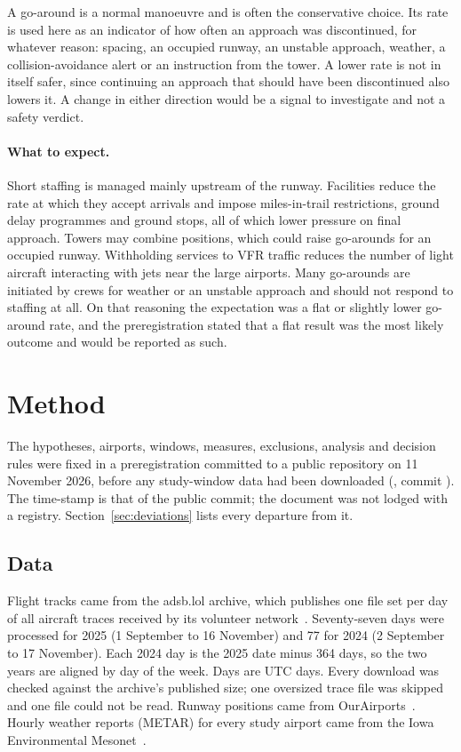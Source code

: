 \documentclass[11pt]{article}
\begin{document}
A go-around is a normal manoeuvre and is often the conservative choice. Its rate is used here as an indicator of how often an approach was discontinued, for whatever reason: spacing, an occupied runway, an unstable approach, weather, a collision-avoidance alert or an instruction from the tower. A lower rate is not in itself safer, since continuing an approach that should have been discontinued also lowers it. A change in either direction would be a signal to investigate and not a safety verdict.

\paragraph{What to expect.} Short staffing is managed mainly upstream of the runway. Facilities reduce the rate at which they accept arrivals and impose miles-in-trail restrictions, ground delay programmes and ground stops, all of which lower pressure on final approach. Towers may combine positions, which could raise go-arounds for an occupied runway. Withholding services to VFR traffic reduces the number of light aircraft interacting with jets near the large airports. Many go-arounds are initiated by crews for weather or an unstable approach and should not respond to staffing at all. On that reasoning the expectation was a flat or slightly lower go-around rate, and the preregistration stated that a flat result was the most likely outcome and would be reported as such.

\section{Method}\label{sec:method}

The hypotheses, airports, windows, measures, exclusions, analysis and decision rules were fixed in a preregistration committed to a public repository on 11 November 2026, before any study-window data had been downloaded (, commit ). The time-stamp is that of the public commit; the document was not lodged with a registry. Section~\ref{sec:deviations} lists every departure from it.

\subsection{Data}

Flight tracks came from the adsb.lol archive, which publishes one file set per day of all aircraft traces received by its volunteer network~\cite{adsblol}. Seventy-seven days were processed for 2025 (1 September to 16 November) and 77 for 2024 (2 September to 17 November). Each 2024 day is the 2025 date minus 364 days, so the two years are aligned by day of the week. Days are UTC days. Every download was checked against the archive's published size; one oversized trace file was skipped and one file could not be read. Runway positions came from OurAirports~\cite{ourairports}. Hourly weather reports (METAR) for every study airport came from the Iowa Environmental Mesonet~\cite{iem}.
\end{document}
